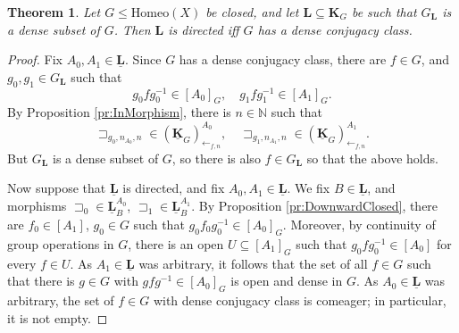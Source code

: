 \documentclass[12pt]{amsart}
\numberwithin{equation}{section}
\theoremstyle{plain}
\newtheorem{theorem}{Theorem}[section]
\newtheorem{proposition}[theorem]{\bf Proposition}
\theoremstyle{definition}
\newcommand \Homeo{ \mbox{Homeo}}
\newcommand \mesh{{\rm{ mesh}}}
\newcommand \sqsp{\sqsupset}
\newcommand \la{\leftarrow}
\newcommand{\cl}{\mbox{cl}}
\newcommand \diam{{\rm{ diam}}}
\newcommand \KKb{\mathbf{K}}
\newcommand \LLb{\mathbf{L}}
\newcommand \KKub{\underline{\mathbf{K}}}
\newcommand \LLub{\underline{\mathbf{L}}}
\newcommand \NN{\mathbb{N}}
\newcommand \It{\mathtt{I}}
\begin{document}
\begin{theorem}
\label{th:Dense} 
Let $G \leq \Homeo(X)$ be closed, and let $\LLb \subseteq \KKb_G$ be such that $G_\LLb$ is a dense subset of $G$. Then  $\LLb$ is directed iff $G$ has a dense conjugacy class. %
\end{theorem}

\begin{proof}
Fix $A_0, A_1 \in \LLub$. Since $G$ has a dense conjugacy class, there are $f \in G$, and  $g_0,g_1 \in G_\LLb$ such that $$g_0fg_0^{-1} \in [A_0]_G, \quad g_1fg_1^{-1} \in [A_1]_G.$$ By Proposition \ref{pr:InMorphism}, there is $n \in \NN$ such that  $$\sqsp_{g_0,n_{A_0}, n} \in (\KKub_G)^{A_0}_{\la_{f,n}}, \quad \sqsp_{g_1,n_{A_1}, n} \in (\KKub_G)^{A_1}_{\la_{f,n}}.$$ But $G_\LLb$ is a dense subset of $G$, so there is also $f \in G_\LLb$ so that the above holds.

Now suppose that $\LLub$ is directed, and fix $A_0, A_1 \in \LLub$. We fix $B \in \LLub$, and morphisms $\sqsp_0 \in \LLub^{A_0}_B$, $\sqsp_1 \in \LLub^{A_1}_B$. By Proposition \ref{pr:DownwardClosed},  there are $f_0 \in [A_1]$,  $g_0 \in G$ such that $g_0 f_0 g^{-1}_0 \in [A_0]_G$. Moreover, by continuity of group operations in $G$, there is an open $U\subseteq [A_1]_G$ such that $g_0fg^{-1}_0 \in [A_0]$ for every $f \in U$.  As $A_1 \in \LLub$ was arbitrary, it follows that the set of all $f \in G$ such that there is $g \in G$ with $g f g^{-1} \in [A_0]_G$ is open and dense in $G$. As $A_0 \in \LLub$ was arbitrary, the set of $f \in G$ with dense conjugacy class is comeager; in particular, it is not empty. 
\end{proof}


%
%
\end{document}
